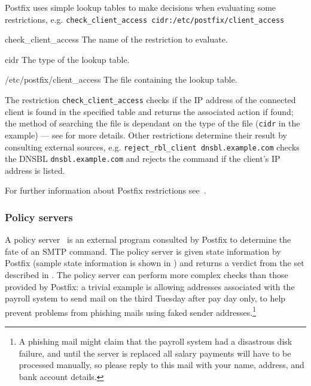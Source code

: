 Postfix uses simple lookup tables to make decisions when evaluating some
restrictions, e.g.\newline{}
\tab{}\texttt{check\_client\_access~cidr:/etc/postfix/client\_access}

\begin{eqlist}

    \item [check\_client\_access] The name of the restriction to evaluate.

    \item [cidr] The type of the lookup table.

    \item [/etc/postfix/client\_access] The file containing the lookup
        table.

\end{eqlist}

The restriction \texttt{check\_client\_access} checks if the \gls{IP}
address of the connected client is found in the specified table and returns
the associated action if found; the method of searching the file is
dependant on the type of the file (\texttt{cidr} in the example) --- see
\cite{postfix-lookup-tables} for more details.  Other restrictions
determine their result by consulting external sources, e.g.\newline{}
\tab{}\texttt{reject\_rbl\_client dnsbl.example.com}\newline{} checks the
\gls{DNSBL} \texttt{dnsbl.example.com} and rejects the command if the
client's \gls{IP} address is listed.

For further information about Postfix restrictions
see~\cite{smtpd_access_readme,smtpd_per_user_control,policy-servers}.

\subsubsection{Policy servers}

\label{policy servers}

A policy server~\cite{policy-servers} is an external program consulted by
Postfix to determine the fate of an \gls{SMTP} command.  The policy server
is given state information by Postfix (sample state information is shown in
) and returns a verdict
from the set described in .  The policy server can perform more complex checks than
those provided by Postfix: a trivial example is allowing addresses
associated with the payroll system to send mail on the third Tuesday after
pay day only, to help prevent problems from phishing mails using faked
sender addresses.\footnote{A phishing mail might claim that the payroll
system had a disastrous disk failure, and until the server is replaced all
salary payments will have to be processed manually, so please reply to this
mail with your name, address, and bank account details.}

